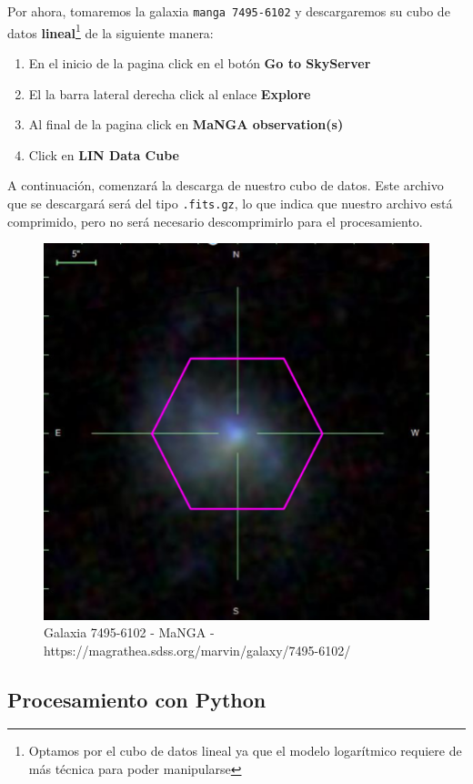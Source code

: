 \documentclass[10pt,twocolumn,a4paper]{opticajnl}
\begin{document}
Por ahora, tomaremos la galaxia \verb|manga 7495-6102| y descargaremos su cubo de datos \textbf{lineal}\footnote{Optamos por el cubo de datos lineal ya que el modelo logarítmico requiere de más técnica para poder manipularse} de la siguiente manera:
\begin{enumerate}
    \item En el inicio de la pagina click en el botón \textbf{Go to SkyServer}
    \item El la barra lateral derecha click al enlace \textbf{Explore}
    \item Al final de la pagina click en \textbf{MaNGA observation(s)}
    \item Click en \textbf{LIN Data Cube}
\end{enumerate}
A continuación, comenzará la descarga de nuestro cubo de datos. Este archivo que se descargará será del tipo \verb|.fits.gz|, lo que indica que nuestro archivo está comprimido, pero no será necesario descomprimirlo para el procesamiento.

\begin{figure}
    \centering
    \includegraphics[width=0.8\linewidth]{manga-7495-6102.png}
    \caption{Galaxia 7495-6102 - MaNGA - https://magrathea.sdss.org/marvin/galaxy/7495-6102/}
    \label{fig:interfacemarvin}
\end{figure}
 
\subsection*{Procesamiento con Python}
\end{document}
